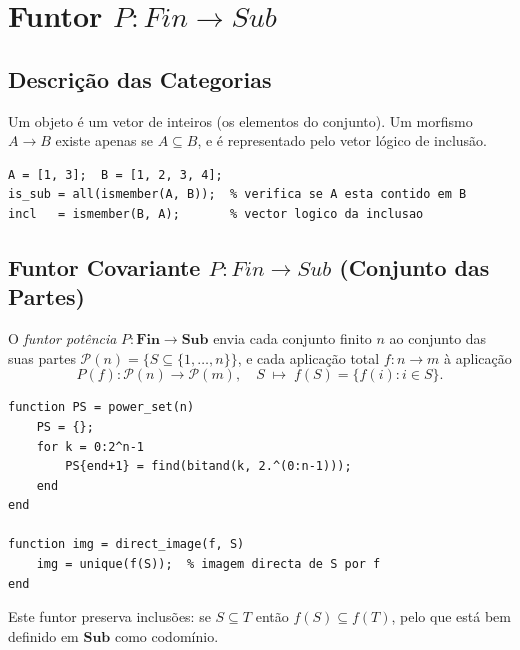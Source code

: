 \section{Funtor \texorpdfstring{$P: Fin \to Sub$}{P: Fin -> Sub}}
\label{sec:functor-fin-sub}

\subsection{Descrição das Categorias}

\begin{definition}
Um objeto é um vetor de inteiros (os elementos do conjunto). Um morfismo $A \to B$ existe apenas se $A \subseteq B$, e é representado pelo vetor lógico de inclusão.
\end{definition}

\begin{lstlisting}[style=matlab, caption={Morfismo de inclusão em $\mathbf{Sub}$}]
A = [1, 3];  B = [1, 2, 3, 4];
is_sub = all(ismember(A, B));  % verifica se A esta contido em B
incl   = ismember(B, A);       % vector logico da inclusao
\end{lstlisting}

\subsection{Funtor Covariante \texorpdfstring{$P: Fin \to Sub$}{P: Fin -> Sub} (Conjunto das Partes)}

O \emph{funtor potência} $P: \mathbf{Fin} \to \mathbf{Sub}$ envia cada conjunto finito $n$ ao conjunto das suas partes $\mathcal{P}(n) = \{S \subseteq \{1,\ldots,n\}\}$, e cada aplicação total $f: n \to m$ à aplicação
\[
    P(f): \mathcal{P}(n) \to \mathcal{P}(m), \quad S \;\longmapsto\; f(S) = \{f(i) : i \in S\}.
\]

\begin{lstlisting}[style=matlab, caption={Funtor potência $P$ e imagem direta}]
function PS = power_set(n)
    PS = {};
    for k = 0:2^n-1
        PS{end+1} = find(bitand(k, 2.^(0:n-1)));
    end
end

function img = direct_image(f, S)
    img = unique(f(S));  % imagem directa de S por f
end
\end{lstlisting}

\begin{remark}
Este funtor preserva inclusões: se $S \subseteq T$ então $f(S) \subseteq f(T)$, pelo que está bem definido em $\mathbf{Sub}$ como codomínio.
\end{remark}

